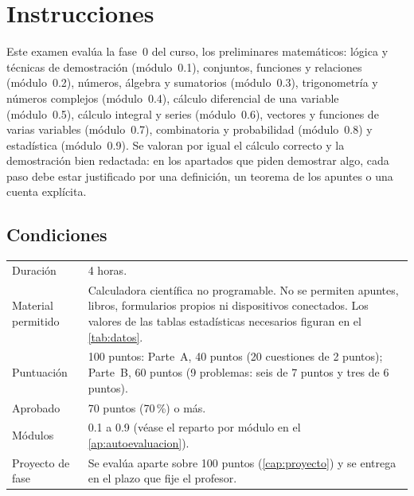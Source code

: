 \chapter*{Instrucciones}

Este examen evalúa la fase~0 del curso, los preliminares matemáticos: lógica y técnicas de demostración (módulo~0.1), conjuntos, funciones y relaciones (módulo~0.2), números, álgebra y sumatorios (módulo~0.3), trigonometría y números complejos (módulo~0.4), cálculo diferencial de una variable (módulo~0.5), cálculo integral y series (módulo~0.6), vectores y funciones de varias variables (módulo~0.7), combinatoria y probabilidad (módulo~0.8) y estadística (módulo~0.9). Se valoran por igual el cálculo correcto y la demostración bien redactada: en los apartados que piden demostrar algo, cada paso debe estar justificado por una definición, un teorema de los apuntes o una cuenta explícita.

\section*{Condiciones}
\begin{center}
\small
\begin{tabularx}{\textwidth}{@{}lX@{}}
\toprule
Duración & 4 horas. \\
Material permitido & Calculadora científica no programable. No se permiten apuntes, libros, formularios propios ni dispositivos conectados. Los valores de las tablas estadísticas necesarios figuran en el \cref{tab:datos}. \\
Puntuación & 100 puntos: Parte~A, 40 puntos (20 cuestiones de 2 puntos); Parte~B, 60 puntos (9 problemas: seis de 7 puntos y tres de 6 puntos). \\
Aprobado & 70 puntos (70\,\%) o más. \\
Módulos & 0.1 a 0.9 (véase el reparto por módulo en el \cref{ap:autoevaluacion}). \\
Proyecto de fase & Se evalúa aparte sobre 100 puntos (\cref{cap:proyecto}) y se entrega en el plazo que fije el profesor. \\
\bottomrule
\end{tabularx}
\end{center}

